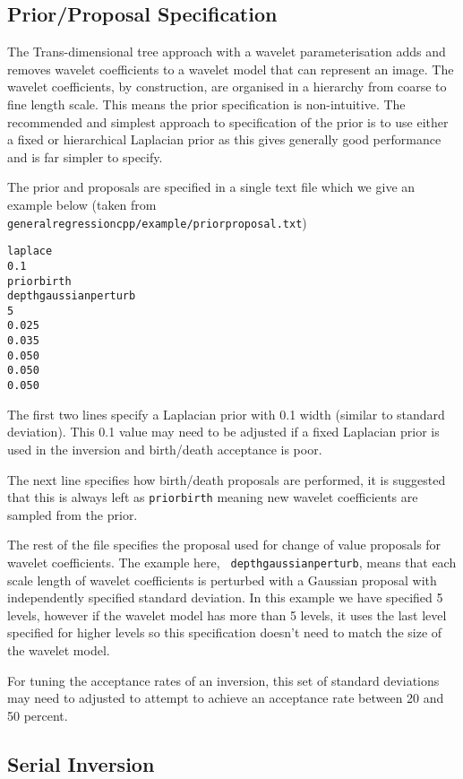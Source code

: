 \documentclass[a4paper,12pt]{article}
\begin{document}
\subsection{Prior/Proposal Specification}

The Trans-dimensional tree approach with a wavelet parameterisation adds and removes
wavelet coefficients to a wavelet model that can represent an image. The wavelet coefficients,
by construction, are organised in a hierarchy from coarse to fine length scale. This
means the prior specification is non-intuitive. The recommended and simplest
approach to specification of the prior is to use either a fixed or hierarchical
Laplacian prior as this gives generally good performance and is far simpler to
specify.

The prior and proposals are specified in a single text file which we give
an example below (taken from {\tt generalregressioncpp/example/priorproposal.txt})

\begin{verbatim}
laplace
0.1
priorbirth
depthgaussianperturb
5
0.025
0.035
0.050
0.050
0.050
\end{verbatim}

The first two lines specify a Laplacian prior with 0.1 width (similar to standard
deviation). This 0.1 value may need to be adjusted if a fixed Laplacian prior is
used in the inversion and birth/death acceptance is poor.

The next line specifies how birth/death proposals are performed, it is
suggested that this is always left as {\tt priorbirth} meaning new
wavelet coefficients are sampled from the prior.

The rest of the file specifies the proposal used for change of value
proposals for wavelet coefficients. The example here, {\tt
  depthgaussianperturb}, means that each scale length of wavelet
coefficients is perturbed with a Gaussian proposal with independently
specified standard deviation. In this example we have specified 5
levels, however if the wavelet model has more than 5 levels, it uses
the last level specified for higher levels so this specification
doesn't need to match the size of the wavelet model.

For tuning the acceptance rates of an inversion, this set of standard
deviations may need to adjusted to attempt to achieve an acceptance
rate between 20 and 50 percent. 

\subsection{Serial Inversion}
\end{document}
